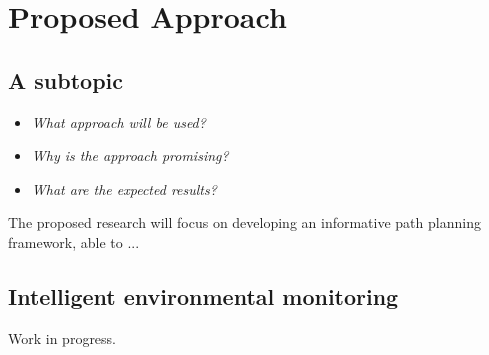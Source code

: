 \section{Proposed Approach}
\label{S:proposed_approach}

\subsection{A subtopic}
\begin{itemize}
	\item \emph{What approach will be used?}
	\item \emph{Why is the approach promising?}
	\item \emph{What are the expected results?}
\end{itemize}

\hrulefill

The proposed research will focus on developing an informative path planning framework, able to ...


\subsection{Intelligent environmental monitoring}

Work in progress.